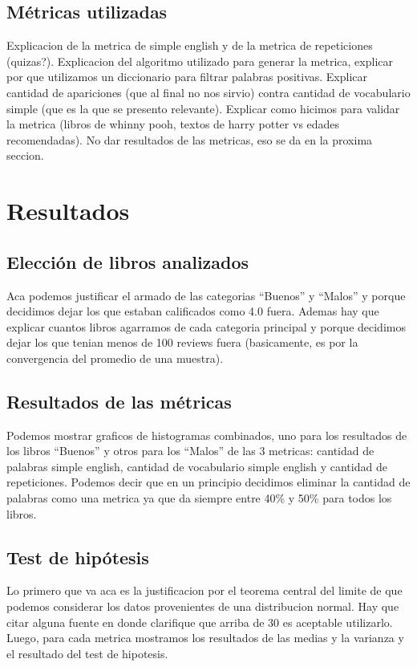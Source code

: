 \documentclass[12pt,journal,compsoc]{IEEEtran}
\begin{document}
\subsection{Métricas utilizadas} Explicacion de la metrica de simple english y de la metrica de repeticiones (quizas?). Explicacion del algoritmo utilizado para generar la metrica, explicar por que utilizamos un diccionario para filtrar palabras positivas. Explicar cantidad de apariciones (que al final no nos sirvio) contra cantidad de vocabulario simple (que es la que se presento relevante). Explicar como hicimos para validar la metrica (libros de whinny pooh, textos de harry potter vs edades recomendadas). No dar resultados de las metricas, eso se da en la proxima seccion.

\section{Resultados}
\subsection{Elección de libros analizados} Aca podemos justificar el armado de las categorias ``Buenos'' y ``Malos'' y porque decidimos dejar los que estaban calificados como 4.0 fuera. Ademas hay que explicar cuantos libros agarramos de cada categoria principal y porque decidimos dejar los que tenian menos de 100 reviews fuera (basicamente, es por la convergencia del promedio de una muestra). \subsection{Resultados de las métricas} Podemos mostrar graficos de histogramas combinados, uno para los resultados de los libros ``Buenos'' y otros para los ``Malos'' de las 3 metricas: cantidad de palabras simple english, cantidad de vocabulario simple english y cantidad de repeticiones. Podemos decir que en un principio decidimos eliminar la cantidad de palabras como una metrica ya que da siempre entre 40\% y 50\% para todos los libros.\\

\subsection{Test de hipótesis} Lo primero que va aca es la justificacion por el teorema central del limite de que podemos considerar los datos provenientes de una distribucion normal. Hay que citar alguna fuente en donde clarifique que arriba de 30 es aceptable utilizarlo. Luego, para cada metrica mostramos los resultados de las medias y la varianza y el resultado del test de hipotesis.
\end{document}
